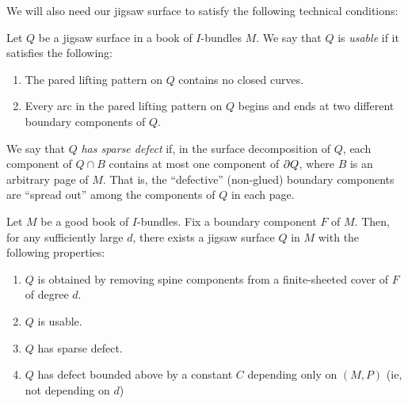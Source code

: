 We will also need our jigsaw surface to satisfy the following
technical conditions:

\begin{defn}

Let $Q$ be a jigsaw surface in a book of $I$-bundles $M$. We say
that $Q$ is \emph{usable} if it satisfies the following:

\begin{enumerate}

\item The pared lifting pattern on $Q$ contains no closed curves.

\item Every arc in the pared lifting pattern on $Q$ begins and ends at two
different boundary components of $Q$.

\end{enumerate}

\end{defn}

\begin{defn}

We say that $Q$ \emph{has sparse defect} if, in the surface decomposition of
$Q$, each component of $Q \cap B$ contains at most one component of $\partial Q$,
where $B$ is an arbitrary page of $M$.  That is, the ``defective'' (non-glued)
boundary components are ``spread out'' among the components of $Q$ in each
page.

\end{defn}

\begin{lemma}\label{L:jigsaw}

Let $M$ be a good book of $I$-bundles. Fix a boundary component $F$ of $M$.
Then, for any sufficiently large $d$, there exists a jigsaw
surface $Q$ in $M$ with the following properties:

\begin{enumerate}

\item $Q$ is obtained by removing spine components from a finite-sheeted cover
of $F$ of degree $d$.

\item $Q$ is usable.

\item $Q$ has sparse defect.

\item $Q$ has defect bounded above by a constant $C$ depending only on $(M,P)$
(ie, not depending on $d$)

\end{enumerate}

\end{lemma}

